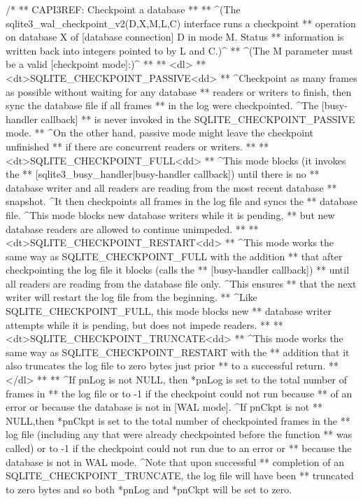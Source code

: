 \begin{Codex}[label=sqlite3.h,numbers=left]
{/*
** CAPI3REF: Checkpoint a database
**
** ^(The sqlite3_wal_checkpoint_v2(D,X,M,L,C) interface runs a checkpoint
** operation on database X of [database connection] D in mode M.  Status
** information is written back into integers pointed to by L and C.)^
** ^(The M parameter must be a valid [checkpoint mode]:)^
**
** <dl>
** <dt>SQLITE_CHECKPOINT_PASSIVE<dd>
**   ^Checkpoint as many frames as possible without waiting for any database 
**   readers or writers to finish, then sync the database file if all frames 
**   in the log were checkpointed. ^The [busy-handler callback]
**   is never invoked in the SQLITE_CHECKPOINT_PASSIVE mode.  
**   ^On the other hand, passive mode might leave the checkpoint unfinished
**   if there are concurrent readers or writers.
**
** <dt>SQLITE_CHECKPOINT_FULL<dd>
**   ^This mode blocks (it invokes the
**   [sqlite3_busy_handler|busy-handler callback]) until there is no
**   database writer and all readers are reading from the most recent database
**   snapshot. ^It then checkpoints all frames in the log file and syncs the
**   database file. ^This mode blocks new database writers while it is pending,
**   but new database readers are allowed to continue unimpeded.
**
** <dt>SQLITE_CHECKPOINT_RESTART<dd>
**   ^This mode works the same way as SQLITE_CHECKPOINT_FULL with the addition
**   that after checkpointing the log file it blocks (calls the 
**   [busy-handler callback])
**   until all readers are reading from the database file only. ^This ensures 
**   that the next writer will restart the log file from the beginning.
**   ^Like SQLITE_CHECKPOINT_FULL, this mode blocks new
**   database writer attempts while it is pending, but does not impede readers.
**
** <dt>SQLITE_CHECKPOINT_TRUNCATE<dd>
**   ^This mode works the same way as SQLITE_CHECKPOINT_RESTART with the
**   addition that it also truncates the log file to zero bytes just prior
**   to a successful return.
** </dl>
**
** ^If pnLog is not NULL, then *pnLog is set to the total number of frames in
** the log file or to -1 if the checkpoint could not run because
** of an error or because the database is not in [WAL mode]. ^If pnCkpt is not
** NULL,then *pnCkpt is set to the total number of checkpointed frames in the
** log file (including any that were already checkpointed before the function
** was called) or to -1 if the checkpoint could not run due to an error or
** because the database is not in WAL mode. ^Note that upon successful
** completion of an SQLITE_CHECKPOINT_TRUNCATE, the log file will have been
** truncated to zero bytes and so both *pnLog and *pnCkpt will be set to zero.
}
\end{Codex}
